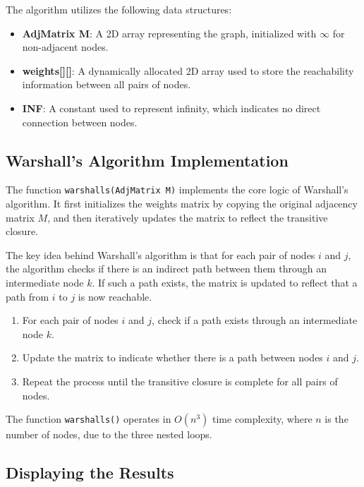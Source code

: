 \documentclass{book}
\begin{document}
The algorithm utilizes the following data structures:

\begin{itemize}
    \item \textbf{AdjMatrix M}: A 2D array representing the graph, initialized with \(\infty\) for non-adjacent nodes.
    \item \textbf{weights[][]}: A dynamically allocated 2D array used to store the reachability information between all pairs of nodes.
    \item \textbf{INF}: A constant used to represent infinity, which indicates no direct connection between nodes.
\end{itemize}

\subsection{Warshall's Algorithm Implementation}

The function \texttt{warshalls(AdjMatrix M)} implements the core logic of Warshall's algorithm. It first initializes the weights matrix by copying the original adjacency matrix \( M \), and then iteratively updates the matrix to reflect the transitive closure.

The key idea behind Warshall's algorithm is that for each pair of nodes \( i \) and \( j \), the algorithm checks if there is an indirect path between them through an intermediate node \( k \). If such a path exists, the matrix is updated to reflect that a path from \( i \) to \( j \) is now reachable.

\begin{enumerate}
    \item For each pair of nodes \( i \) and \( j \), check if a path exists through an intermediate node \( k \).
    \item Update the matrix to indicate whether there is a path between nodes \( i \) and \( j \).
    \item Repeat the process until the transitive closure is complete for all pairs of nodes.
\end{enumerate}

The function \texttt{warshalls()} operates in \( O(n^3) \) time complexity, where \( n \) is the number of nodes, due to the three nested loops.

\subsection{Displaying the Results}
\end{document}
